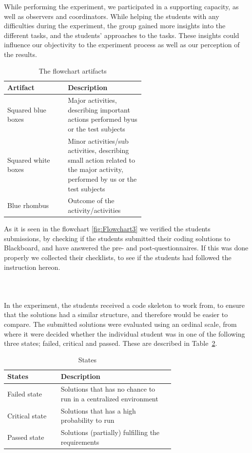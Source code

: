 \documentclass{sig-alternate-05-2015}
\begin{document}
While performing the experiment, we participated in a supporting capacity, as well as observers and coordinators. While helping the students with any difficulties during the experiment, the group gained more insights into the different tasks, and the students' approaches to the tasks. These insights could influence our objectivity to the experiment process as well as our perception of the results.\\
\begin{table}[!ht]
\centering
\caption{The flowchart artifacts}
\label{tab:The flowchart artifacts:}
\begin{tabular}{|l|p{0.56\linewidth}|}
\hline
\textbf{Artifact} & \textbf{Description} \\
\hline
\hline
Squared blue boxes & Major activities, describing important actions performed byus or the test subjects\\
Squared white boxes & Minor activities/sub activities, describing small action related to the major activity, performed by us or the test subjects\\
Blue rhombus & Outcome of the activity/activities\\
\hline
\end{tabular}
\end{table}

As it is seen in the flowchart \ref{fig:Flowchart3} we verified the students submissions, by checking if the students submitted their coding solutions to Blackboard, and have answered the pre- and post-questionnaires. If this was done properly we collected their checklists, to see if the students had followed the instruction hereon.\\\\\\\\

In the experiment, the students received a code skeleton to work from, to ensure that the solutions had a similar structure, and therefore would be easier to compare. The submitted solutions were evaluated using an ordinal scale, from where it were decided whether the individual student was in one of the following three states; failed, critical and passed. These are described in Table~\ref{StatesTable}.

\begin{table}[!ht]
\centering
\caption{States}
\label{StatesTable}
\begin{tabular}{|l|p{0.68\linewidth}|}
\hline
\textbf{States} & \textbf{Description} \\
\hline
\hline
Failed state & Solutions that has no chance to run in a centralized environment \\
Critical state & Solutions that has a high probability to run \\
Passed state & Solutions (partially) fulfilling the requirements \\
\hline
\end{tabular}
\end{table}
\end{document}
